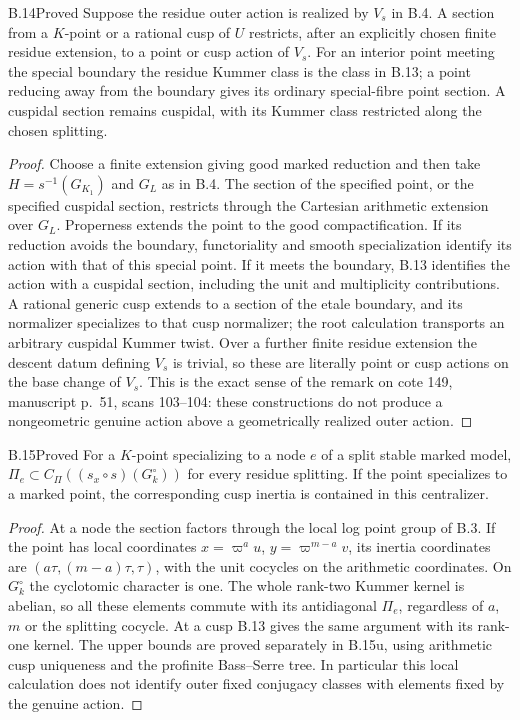 \begin{claim}{B.14}{Proved}
Suppose the residue outer action is realized by $V_s$ in B.4. A section
from a $K$-point or a rational cusp of $U$ restricts, after an explicitly
chosen finite residue extension, to a point or cusp action of $V_s$.
For an interior point meeting the special boundary the residue Kummer class
is the class in B.13; a point reducing away from the boundary gives its
ordinary special-fibre point section. A cuspidal section remains cuspidal,
with its Kummer class restricted along the chosen splitting.
\end{claim}
\begin{proof}
Choose a finite extension giving good marked reduction and then take
$H=s^{-1}(G_{K_1})$ and $G_L$ as in B.4. The section of the specified
point, or the specified cuspidal section, restricts through the Cartesian
arithmetic extension over $G_L$. Properness extends the point to the good
compactification. If its reduction avoids the boundary, functoriality and
smooth specialization identify its action with that of this special point.
If it meets the boundary, B.13 identifies the action with a cuspidal
section, including the unit and multiplicity contributions. A rational
generic cusp extends to a section of the etale boundary, and its normalizer
specializes to that cusp normalizer; the root calculation transports an
arbitrary cuspidal Kummer twist. Over a further finite residue extension the
descent datum defining $V_s$ is trivial, so these are literally point or cusp
actions on the base change of $V_s$. This is the exact sense of the remark
on cote 149, manuscript p.~51, scans 103--104: these constructions do
not produce a nongeometric genuine action above a geometrically realized
outer action.
\end{proof}

\begin{claim}{B.15}{Proved}
For a $K$-point specializing to a node $e$ of a split stable marked model,
$\Pi_e\subset C_\Pi((s_x\circ s)(G_k^\circ))$ for every residue splitting.
If the point specializes to a marked point, the corresponding cusp inertia
is contained in this centralizer.
\end{claim}
\begin{proof}
At a node the section factors through the local log point group of B.3.
If the point has local coordinates $x=\varpi^a u$,
$y=\varpi^{m-a}v$, its inertia coordinates are $(a\tau,(m-a)\tau,\tau)$,
with the unit cocycles on the arithmetic coordinates. On $G_k^\circ$ the
cyclotomic character is one. The whole rank-two Kummer kernel is abelian,
so all these elements commute with its antidiagonal $\Pi_e$, regardless
of $a$, $m$ or the splitting cocycle. At a cusp B.13 gives the same argument
with its rank-one kernel. The upper bounds are proved separately in
B.15u, using arithmetic cusp uniqueness and the profinite Bass--Serre tree.
In particular this local calculation does not identify outer fixed
conjugacy classes with elements fixed by the genuine action.
\end{proof}

